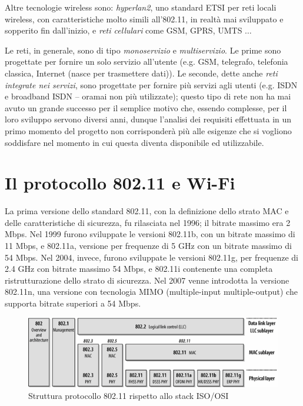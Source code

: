 Altre tecnologie wireless sono: \textit{hyperlan2}, uno standard ETSI per reti locali wireless, con caratteristiche molto simili all'802.11, in realtà mai sviluppato e sopperito fin dall'inizio, e \textit{reti cellulari} come GSM, GPRS, UMTS $\dots$

Le reti, in generale, sono di tipo \textit{monoservizio} e \textit{multiservizio}. Le prime sono progettate per fornire un solo servizio all'utente (e.g. GSM, telegrafo, telefonia classica, Internet (nasce per trasmettere dati)). Le seconde, dette anche \textit{reti integrate nei servizi}, sono progettate per fornire più servizi agli utenti (e.g. ISDN e broadband ISDN -- oramai non più utilizzate); questo tipo di rete non ha mai avuto un grande successo per il semplice motivo che, essendo complesse, per il loro sviluppo servono diversi anni, dunque l'analisi dei requisiti effettuata in un primo momento del progetto non corrisponderà più alle esigenze che si vogliono soddisfare nel momento in cui questa diventa disponibile ed utilizzabile.

\section{Il protocollo 802.11 e Wi-Fi}
La prima versione dello standard 802.11, con la definizione dello strato MAC e delle caratteristiche di sicurezza, fu rilasciata nel 1996; il bitrate massimo era 2 Mbps. Nel 1999 furono sviluppate le versioni 802.11b, con un bitrate massimo di 11 Mbps, e 802.11a, versione per frequenze di 5 GHz con un bitrate massimo di 54 Mbps. Nel 2004, invece, furono sviluppate le versioni 802.11g, per frequenze di 2.4 GHz con bitrate massimo 54 Mbps, e 802.11i contenente una completa ristrutturazione dello strato di sicurezza. Nel 2007 venne introdotta la versione 802.11n, una versione con tecnologia MIMO (multiple-input multiple-output) che supporta bitrate superiori a 54 Mbps.

\begin{figure}[htbp]
	\centering
	\includegraphics[scale = 0.7]{images/80211-iso}
	\caption{Struttura protocollo 802.11 rispetto allo stack ISO/OSI}
	\label{img:80211-iso}
\end{figure}


